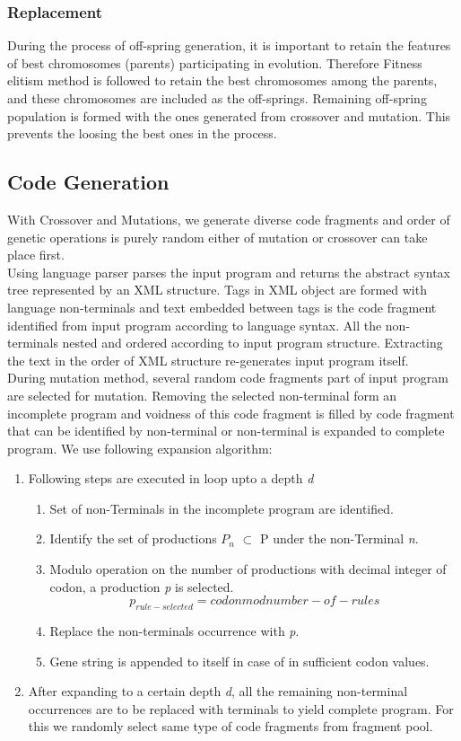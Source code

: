 \documentclass{sig-alternate}
\begin{document}
\subsubsection{Replacement}
\indent During the process of off-spring generation, it is important to retain the features of best chromosomes (parents) participating in evolution. Therefore Fitness elitism method is followed to retain the best chromosomes among the parents, and these chromosomes are included as the off-springs. Remaining off-spring population is formed with the ones generated from crossover and mutation. This prevents the loosing the best ones in the process.

\subsection{Code Generation} \label{sec:cgen}
\indent With Crossover and Mutations, we generate diverse code fragments and order of genetic operations is purely random either of mutation or crossover can take place first. \\
\indent Using language parser parses the input program and returns the abstract syntax tree represented by an XML structure. Tags in XML object are formed with language non-terminals and text embedded between tags is the code fragment identified from input program according to language syntax. All the non-terminals nested and ordered according to input program structure. Extracting the text in the order of XML structure re-generates input program itself. \\
\indent During mutation method, several random code fragments part of input program are selected for mutation. Removing the selected non-terminal form an incomplete program and voidness of this code fragment is filled by code fragment that can be identified by non-terminal or non-terminal is expanded to complete program. We use following expansion algorithm:
\begin{enumerate}
\item Following steps are executed in loop     upto a depth \textit{d}
\begin{enumerate}
\item Set of non-Terminals in the incomplete program are identified.
\item Identify the set of productions $P_{n}$ $\subset$ P under the non-Terminal \textit{n}.
\item Modulo operation on the number of productions with decimal integer of codon, a production \textit{p} is selected. 
\[p_{rule-selected} = codon mod number-of-rules\]
\item Replace the non-terminals occurrence with \textit{p}.
\item Gene string is appended to itself in case of in sufficient codon values.
\end{enumerate}
\item After expanding to a certain depth \textit{d}, all the remaining non-terminal occurrences are to be replaced with terminals to yield complete program. For this we randomly select same type of code fragments from fragment pool.
\end{enumerate}
\end{document}
